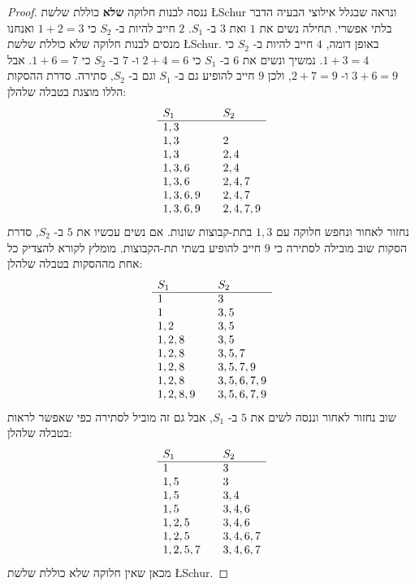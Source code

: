 \begin{proof}
ננסה לבנות חלוקה 
\textbf{שלא}
כוללת שלשת
\L{Schur}
ונראה שבגלל אילוצי הבעיה הדבר בלתי אפשרי. תחילה נשים את
$1$
ואת
$3$
ב-%
$S_1$.
$2$
חייב להיות ב-%
$S_2$
כי
$1+2=3$
ואנחנו מנסים לבנות חלוקה שלא כוללת שלשת
\L{Schur}.
באופן דומה, 
$4$
חייב להיות ב-%
$S_2$
כי
$1+3=4$.
נמשיך ונשים את
$6$
ב-%
$S_1$
כי
$2+4=6$
ו-%
$7$
ב-%
$S_2$
כי
$1+6=7$.
אבל
$3+6=9$
ו-%
$2+7=9$,
ולכן
$9$
חייב להופיע גם ב-%
$S_1$
וגם ב-%
$S_2$, 
סתירה. סדרת ההסקות הללו מוצגת בטבלה שלהלן:
\[
\begin{array}{l@{\hspace{2em}}l}
S_1&S_2\\\hline
1,3 & \\
1,3 & 2\\
1,3 & 2,4\\
1,3,6 & 2,4\\
1,3,6 & 2,4,7\\
1,3,6,9 & 2,4,7\\
1,3,6,9 & 2,4,7,9
\end{array}
\]
נחזור לאחור ונחפש חלוקה עם 
$1,3$
בתת-קבוצות שונות. אם נשים עכשיו את 
$5$
ב-%
$S_2$, 
סדרת הסקות שוב מובילה לסתירה כי 
$9$
חייב להופיע בשתי תת-הקבוצות. מומלץ לקורא להצדיק כל אחת מההסקות בטבלה שלהלן:
\[
\begin{array}{l@{\hspace{2em}}l}
S_1&S_2\\\hline
1&3\\
1 & 3,5\\
1,2&3,5\\
1,2,8&3,5\\
1,2,8&3,5,7\\
1,2,8&3,5,7,9\\
1,2,8&3,5,6,7,9\\
1,2,8,9&3,5,6,7,9
\end{array}
\]
שוב נחזור לאחור וננסה לשים את 
$5$
ב-%
$S_1$,
אבל גם זה מוביל לסתירה כפי שאפשר לראות בטבלה שלהלן:
\[
\begin{array}{l@{\hspace{2em}}l}
S_1&S_2\\\hline
1&3\\
1,5& 3\\
1,5&3,4\\
1,5&3,4,6\\
1,2,5&3,4,6\\
1,2,5&3,4,6,7\\
1,2,5,7&3,4,6,7
\end{array}
\]
מכאן שאין חלוקה שלא כוללת שלשת
\L{Schur}.
\end{proof}

